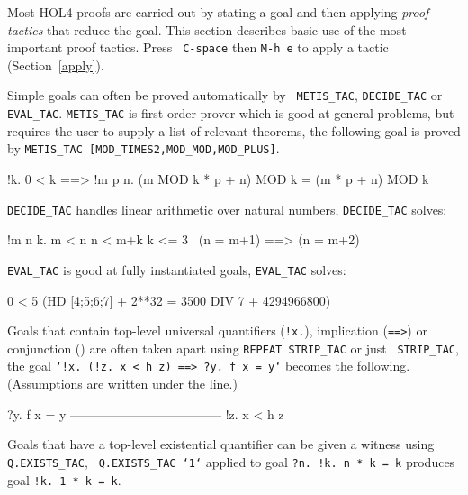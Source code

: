 \documentclass[a4paper,10pt]{article}
\begin{document}

Most HOL4 proofs are carried out by stating a goal and then applying
\emph{proof tactics} that reduce the goal.  This section describes
basic use of the most important proof tactics.  Press {\tt\small
  C-space} then {\tt\small M-h e} to apply a tactic
(Section~\ref{apply}).



Simple goals can often be proved automatically by {\tt\small
  METIS\_TAC}, {\tt\small DECIDE\_TAC} or {\tt\small EVAL\_TAC}.
{\tt\small METIS\_TAC} is first-order prover which is good at general
problems, but requires the user to supply a list of relevant theorems,
\eg{} the following goal is proved by {\tt\small METIS\_TAC
  [MOD\_TIMES2,MOD\_MOD,MOD\_PLUS]}.
\begin{code}
!k. 0 < k ==> !m p n. (m MOD k * p + n) MOD k = (m * p + n) MOD k
\end{code}

\noindent
{\tt\small DECIDE\_TAC} handles linear arithmetic over natural
numbers, \eg{} {\tt\small DECIDE\_TAC} solves:
\begin{code}
!m n k. m < n \conj{} n < m+k \conj{} k <= 3 \conj{} ~(n = m+1) ==> (n = m+2)
\end{code}
{\tt\small EVAL\_TAC} is good at fully instantiated goals, \eg{} {\tt\small EVAL\_TAC} solves:
\begin{code}
0 < 5 \conj{} (HD [4;5;6;7] + 2**32 = 3500 DIV 7 + 4294966800)
\end{code}


Goals that contain top-level universal quantifiers ({\tt !x.}),
implication ({\tt ==>}) or conjunction ({\tt \conj{}}) are often
taken apart using {\tt\small REPEAT STRIP\_TAC} or just {\tt\small
  STRIP\_TAC}, \eg{} the goal {\tt\small `!x{.}~(!z{.}~x < h z) ==> ?y{.}~f x = y`}
becomes the following. (Assumptions are written under the line.)
\begin{code}
    ?y. f x = y
    ------------------------------------
      !z. x < h z
\end{code}


Goals that have a top-level existential quantifier can be given a
witness using {\tt \small Q.EXISTS\_TAC}, \eg{} {\tt \small
  Q.EXISTS\_TAC `1`} applied to goal {\tt \small ?n{.}~!k{.}~n * k = k}
produces goal {\tt \small !k{.}~1 * k = k}.
\end{document}
